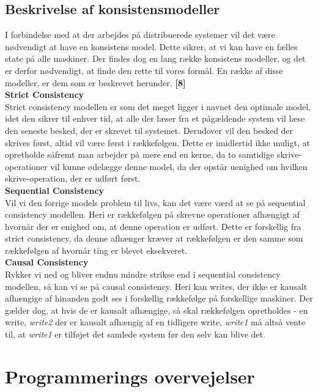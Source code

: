 \documentclass[a4paper,12pt]{article}
\begin{document}
\subsection{Beskrivelse af konsistensmodeller}
I forbindelse med at der arbejdes på distribuerede systemer vil det være nødvendigt at have en konsistens model. Dette sikrer, at vi kan have en fælles state på alle maskiner. 
Der findes dog en lang række konsistens modeller, og det er derfor nødvendigt, at finde den rette til vores formål. En række af disse modeller, er dem som er beskrevet herunder. \textbf{[8]}
\\[5px]
\textbf{Strict Consistency}
\\
Strict consistency modellen er som det meget ligger i navnet den optimale model, idet den sikrer til enhver tid, at alle der læser fra et pågældende system vil læse den seneste besked, der er skrevet til systemet. Derudover vil den besked der skrives først, altid vil være først i rækkefølgen. Dette er imidlertid ikke muligt, at opretholde såfremt man arbejder på mere end en kerne, da to samtidige skrive-operationer vil kunne ødelægge denne model, da der opstår uenighed om hvilken skrive-operation, der er udført først.
\\[5px]
\textbf{Sequential Consistency}
\\
Vil vi den forrige models problem til livs, kan det være værd at se på sequential consistency modellen. Heri er rækkefølgen på skrevne operationer afhængigt af hvornår der er enighed om, at denne operation er udført. Dette er forskellig fra strict consistency, da denne afhænger kræver at rækkefølgen er den samme som rækkefølgen af hvornår ting er blevet eksekveret.
\\[5px]
\textbf{Causal Consistency}
\\
Rykker vi ned og bliver endnu mindre strikse end i sequential consistency modellen, så kan vi se på causal consistency. Heri kan writes, der ikke er kausalt afhængige af hinanden godt ses i forskellig rækkefølge på forskellige maskiner. Der gælder dog, at hvis de er kausalt afhængige, så skal rækkefølgen opretholdes - en write, \textit{write2} der er kausalt afhængig af en tidligere write, \textit{write1} må altså vente til, at \textit{write1} er tilføjet det samlede system før den selv kan blive det.
\newpage

\section{Programmerings overvejelser}
\end{document}
